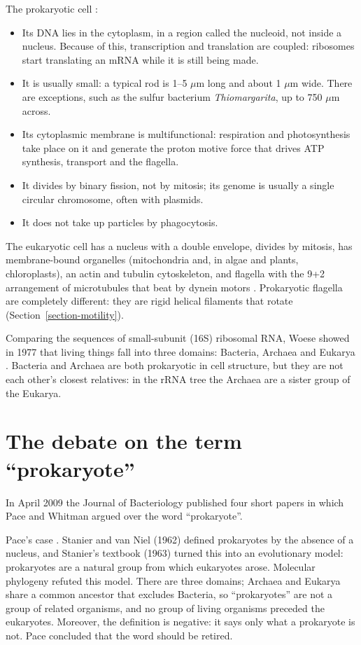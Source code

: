 The prokaryotic cell \cite[Section
2.5]{madigan2012brock}
\cite{whitman2009modern}:
\begin{itemize}
\item Its DNA lies in the cytoplasm, in a
region called the nucleoid, not inside a
nucleus. Because of this, transcription and
translation are coupled: ribosomes start
translating an mRNA while it is still being
made.
\item It is usually small: a typical rod is
1--5 $\mu$m long and about 1 $\mu$m wide.
There are exceptions, such as the sulfur
bacterium \emph{Thiomargarita}, up to 750
$\mu$m across.
\item Its cytoplasmic membrane is
multifunctional: respiration and
photosynthesis take place on it and generate
the proton motive force that drives ATP
synthesis, transport and the flagella.
\item It divides by binary fission, not by
mitosis; its genome is usually a single
circular chromosome, often with plasmids.
\item It does not take up particles by
phagocytosis.
\end{itemize}
The eukaryotic cell has a nucleus with a
double envelope, divides by mitosis, has
membrane-bound organelles (mitochondria and,
in algae and plants, chloroplasts), an actin
and tubulin cytoskeleton, and flagella with
the 9+2 arrangement of microtubules that beat
by dynein motors \cite[Chapter
1]{lee2008phycology}. Prokaryotic flagella
are completely different: they are rigid
helical filaments that rotate
(Section~\ref{section-motility}).

Comparing the sequences of small-subunit
(16S) ribosomal RNA, Woese showed in 1977
that living things fall into three domains:
Bacteria, Archaea and Eukarya \cite[Section
2.7]{madigan2012brock}
\cite{pace2009problems}. Bacteria and Archaea
are both prokaryotic in cell structure, but
they are not each other's closest relatives:
in the rRNA tree the Archaea are a sister
group of the Eukarya.

\section{The debate on the term
``prokaryote''}
\label{section-prokaryote-debate}

In April 2009 the Journal of Bacteriology
published four short papers in which Pace and
Whitman argued over the word ``prokaryote''.

Pace's case \cite{pace2009problems,
pace2009rebuttal}. Stanier and van Niel
(1962) defined prokaryotes by the absence of
a nucleus, and Stanier's textbook (1963)
turned this into an evolutionary model:
prokaryotes are a natural group from which
eukaryotes arose. Molecular phylogeny refuted
this model. There are three domains; Archaea
and Eukarya share a common ancestor that
excludes Bacteria, so ``prokaryotes'' are not
a group of related organisms, and no group of
living organisms preceded the eukaryotes.
Moreover, the definition is negative: it says
only what a prokaryote is not. Pace concluded
that the word should be retired.

